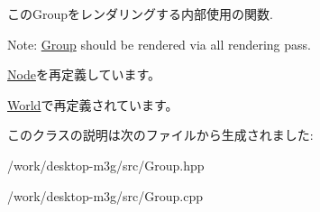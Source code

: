 このGroupをレンダリングする内部使用の関数.

Note: \hyperlink{classm3g_1_1Group}{Group} should be rendered via all rendering pass. 

\hyperlink{classm3g_1_1Node_1efcb1973989d9963d5bd6d03065d389}{Node}を再定義しています。

\hyperlink{classm3g_1_1World_1efcb1973989d9963d5bd6d03065d389}{World}で再定義されています。

このクラスの説明は次のファイルから生成されました:\begin{CompactItemize}
\item 
/work/desktop-m3g/src/Group.hpp\item 
/work/desktop-m3g/src/Group.cpp\end{CompactItemize}
